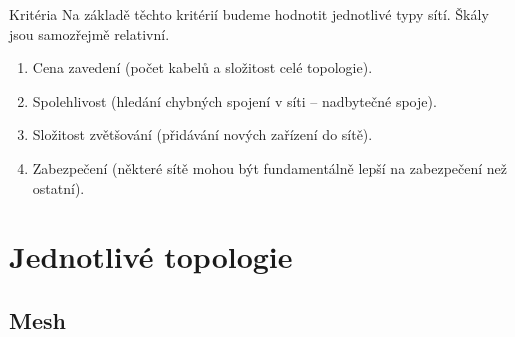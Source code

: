 \documentclass{beamer}
\begin{document}
\begin{frame}{Kritéria}
 Na základě těchto kritérií budeme hodnotit jednotlivé typy sítí. Škály jsou
 samozřejmě relativní.

 \begin{enumerate}
 	\item Cena zavedení (počet kabelů a složitost celé topologie).
 	\item Spolehlivost (hledání chybných spojení v síti -- nadbytečné spoje).
 	\item Složitost zvětšování (přidávání nových zařízení do sítě).
 	\item Zabezpečení (některé sítě mohou být fundamentálně lepší na zabezpečení
 	 než ostatní).
 \end{enumerate} 
\end{frame}


\section{Jednotlivé topologie}
\label{sec:jednotlive-topologie}


\subsection{Mesh}
\label{sec:mesh}
\end{document}
